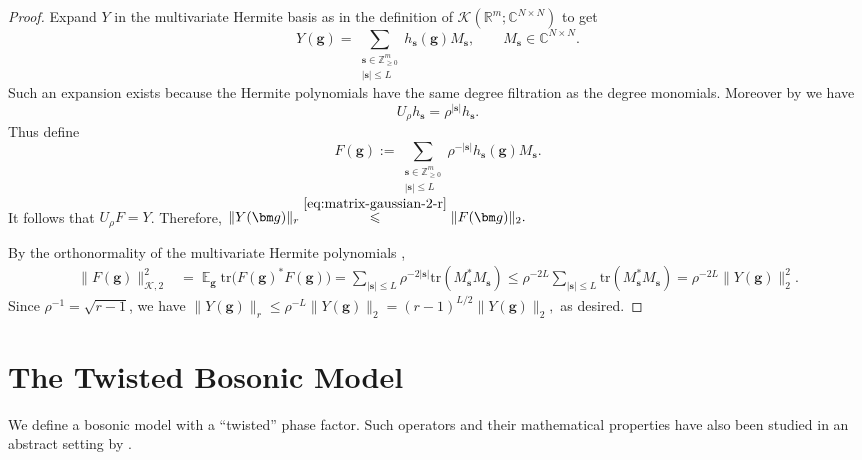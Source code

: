 \documentclass
[11pt,letterpaper]
{article}
\theoremstyle{definition}
\newcommand{\R}{{\mathbb R}}
\newcommand{\1}{\mathbf{1}}
\newcommand{\tr}{\mathrm{tr}}
\newcommand{\Z}{\mathbb Z}
\newcommand{\C}{\mathbb C}
\DeclareMathOperator*{\E}{\mathbb{E}}
\newcommand{\cK}{\mathcal K}
\renewcommand{\geq}{\geqslant}
\renewcommand{\leq}{\leqslant}
\begin{document}
\begin{proof}
Expand $Y$ in the multivariate Hermite basis as in the definition of $\cK(\R^m;\C^{N\times N})$ to get
\[
    Y(\bm g)
    =
    \sum_{\substack{\bm s\in\Z_{\geq 0}^m\\|\bm s|\leq L}}
    h_{\bm s}(\bm g)M_{\bm s},
    \qquad
    M_{\bm s}\in\C^{N\times N}.
\]
Such an expansion exists because the Hermite polynomials have the same
degree filtration as the degree monomials. Moreover by \cite[Proposition~11.33]{ODonnell21} we have
\[
    U_\rho h_{\bm s}
    =
    \rho^{|\bm s|}h_{\bm s}.
\]
Thus define
\[
    F(\bm g)
    :=
    \sum_{\substack{\bm s\in\Z_{\geq 0}^m\\|\bm s|\leq L}}
    \rho^{-|\bm s|}h_{\bm s}(\bm g)M_{\bm s}.
\]
It follows that $U_\rho F=Y$. Therefore, $
    \|Y(\bm g)\|_r
    \overset{\eqref{eq:matrix-gaussian-2-r}}{\leq}
    \|F(\bm g)\|_2.$

By the orthonormality of the multivariate Hermite polynomials
\cite[Proposition~11.33]{ODonnell21},
\begin{align*}
    \|F(\bm g)\|_{\cK, 2}^2
    &=
    \E_{\bm g}
    \tr\bigl(F(\bm g)^*F(\bm g)\bigr)=
    \sum_{|\bm s|\leq L}
    \rho^{-2|\bm s|}
    \tr(M_{\bm s}^*M_{\bm s})\leq
    \rho^{-2L}
    \sum_{|\bm s|\leq L}
    \tr(M_{\bm s}^*M_{\bm s})=
    \rho^{-2L}\|Y(\bm g)\|_2^2.
\end{align*}
Since $\rho^{-1}=\sqrt{r-1}$, we have $
    \|Y(\bm g)\|_r
    \leq
    \rho^{-L}\|Y(\bm g)\|_2
    =
    (r-1)^{L/2}\|Y(\bm g)\|_2,$
as desired.
\end{proof}

\section{The Twisted Bosonic Model}\label{sec:twisted-fock-space}


We define a bosonic model with a ``twisted'' phase factor. Such operators and their mathematical properties have also been studied in an abstract setting by \cite{DoresicMM94,MeljanacMP94,MeljanacM96}. 
\end{document}
